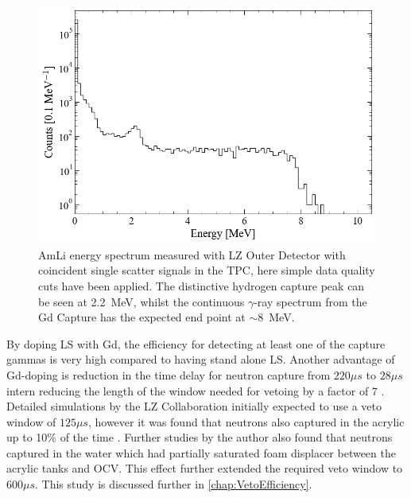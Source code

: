 \begin{figure}
    \centering
    \includegraphics[width=0.7\linewidth]{figures/LZ/ODEnergySpec.png}
    \caption{AmLi energy spectrum measured with LZ Outer Detector with coincident single scatter signals in the TPC, here simple data quality cuts have been applied. The distinctive hydrogen capture peak can be seen at 2.2~MeV, whilst the continuous $\gamma$-ray spectrum from the Gd Capture has the expected end point at $\mathtt{\sim}$8~MeV.}
    \label{fig:ODEnergySpec}
\end{figure}

By doping LS with Gd, the efficiency for detecting at least one of the capture gammas is very high compared to having stand alone LS. Another advantage of Gd-doping is reduction in the time delay for neutron capture from $220\mu s$ to $28\mu s$ intern reducing the length of the window needed for vetoing by a factor of 7 \cite{LZTDR}. Detailed simulations by the LZ Collaboration initially expected to use a veto window of $125\mu s$, however it was found that neutrons also captured in the acrylic up to 10\% of the time \cite{LZTDR}. Further studies by the author also found that neutrons captured in the water which had partially saturated foam displacer between the acrylic tanks and OCV. This effect further extended the required veto window to $600\mu s$. This study is discussed further in \autoref{chap:VetoEfficiency}.

